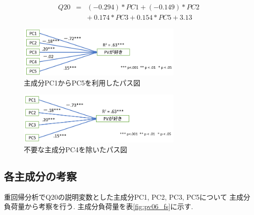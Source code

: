 \documentclass[12pt, a4j]{jsarticle}
\begin{document}
      \begin{eqnarray}
        Q20 &=& (-0.294) * PC1 + (-0.149) * PC2 \nonumber \\
            & & +\ 0.174 * PC3 + 0.154 * PC5 + 3.13
        \label{eq:pv06}
      \end{eqnarray}
      
      \begin{figure}[htb]
        \centering
        \includegraphics[width=8cm]{../2nd/pv06/path1.png}
        \caption{主成分PC1からPC5を利用したパス図}
        \label{fig:pv06_path1}
      \end{figure}

      \begin{figure}[htb]
        \centering
        \includegraphics[width=8cm]{../2nd/pv06/path2.png}
        \caption{不要な主成分PC4を除いたパス図}
        \label{fig:pv06_path2}
      \end{figure}
    \subsection{各主成分の考察}
      重回帰分析でQ20の説明変数とした主成分PC1, PC2, PC3, PC5について
      主成分負荷量から考察を行う. 主成分負荷量を表\ref{fig:pv06_fs}に示す. 
\end{document}
